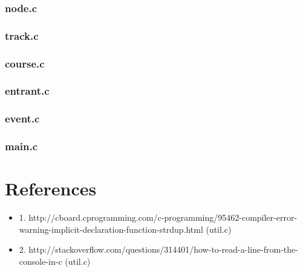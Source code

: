 \documentclass[a4paper, twoside]{article}
\begin{document}
\subsubsection{node.c}

\subsubsection{track.c}

\subsubsection{course.c}

\subsubsection{entrant.c}

\subsubsection{event.c}

\subsubsection{main.c}


\section{References}
\begin{itemize}
\item{1. http://cboard.cprogramming.com/c-programming/95462-compiler-error-warning-implicit-declaration-function-strdup.html (util.c)}
\item{2. http://stackoverflow.com/questions/314401/how-to-read-a-line-from-the-console-in-c (util.c)}
\end{itemize}
\end{document}
